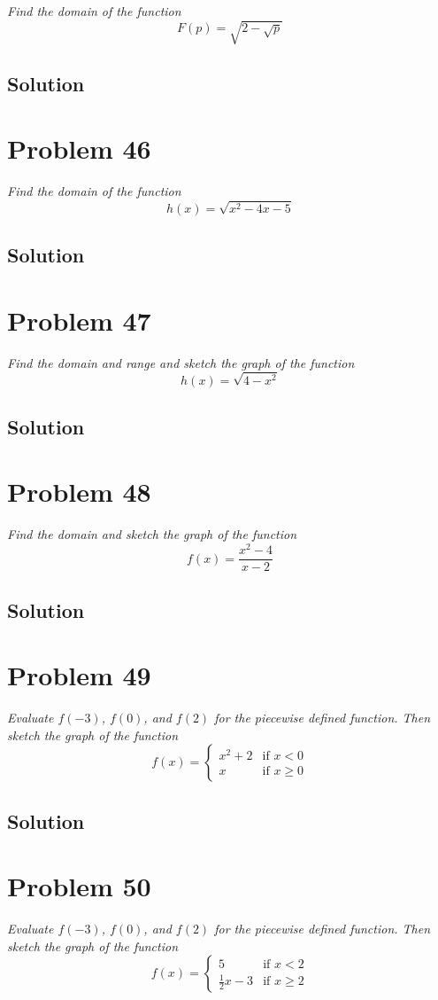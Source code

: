 \documentclass[11pt]{article}
\newcommand{\soln}{\subsection*}
\newcommand{\qn}{\textit}
\begin{document}
\qn{Find the domain of the function $$F(p)=\sqrt{2-\sqrt{p}}$$}

\soln{Solution}

\section*{Problem 46}

\qn{Find the domain of the function $$h(x)=\sqrt{x^2-4x-5}$$}

\soln{Solution}

\section*{Problem 47}

\qn{Find the domain and range and sketch the graph of the function $$h(x)=\sqrt{4-x^2}$$}

\soln{Solution}

\section*{Problem 48}

\qn{Find the domain and sketch the graph of the function $$f(x)=\frac{x^2-4}{x-2}$$}

\soln{Solution}

\section*{Problem 49}

\qn{Evaluate $f(-3)$, $f(0)$, and $f(2)$ for the piecewise defined function. Then sketch the graph of the function}
\begin{equation}
	f(x)=
	\begin{cases}
		x^2+2 & \text{if } x < 0\\
		x & \text{if } x \ge 0
	\end{cases}
\end{equation}

\soln{Solution}

\section*{Problem 50}

\qn{Evaluate $f(-3)$, $f(0)$, and $f(2)$ for the piecewise defined function. Then sketch the graph of the function}
\begin{equation}
	f(x)=
	\begin{cases}
		5 & \text{if } x < 2\\
		\frac{1}{2}x-3 & \text{if } x \ge 2
	\end{cases}
\end{equation}
\end{document}
